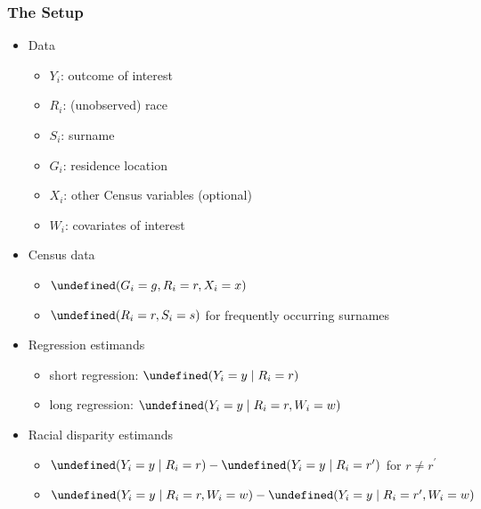 \documentclass{beamer}
\let\Pr\undefined
\DeclareMathOperator{\Pr}{\mathbb{P}}
\begin{document}
\begin{frame}

\frametitle{The Setup}


\begin{itemize}
\item<1-> Data
  \begin{itemize}
  \item<1-> $Y_i$: outcome of interest 
  \item<1-> $R_i$: (unobserved) race
  \item<1-> $S_i$: surname
  \item<1-> $G_i$: residence location
  \item<1-> $X_i$: other Census variables (optional)
  \item<1-> $W_i$: covariates of interest
  \end{itemize}
\item<2-> Census data
  \begin{itemize}
  \item<2-> $\Pr(G_i = g, R_i = r, X_i = x)$
  \item<2-> $\Pr(R_i = r, S_i =s)$ for frequently occurring surnames
  \end{itemize}

  \vfill
\item<3-> Regression estimands
  \begin{itemize}
  \item<3-> short regression: $\Pr(Y_i = y \mid R_i = r)$
  \item<3-> long regression: $\Pr(Y_i = y \mid R_i = r, W_i =w)$
  \end{itemize}

\item<4-> Racial disparity estimands
  \begin{itemize}
  \item<4-> $\Pr(Y_i =y \mid R_i = r) - \Pr(Y_i = y \mid R_i = r^\prime)$ for $r
    \ne r^\prime$
  \item<4-> $\Pr(Y_i = y \mid R_i = r, W_i = w) - \Pr(Y_i = y \mid R_i = r^\prime, W_i = w)$
  \end{itemize}
\vspace{-.25in}
\end{itemize}

\end{frame}
\end{document}
